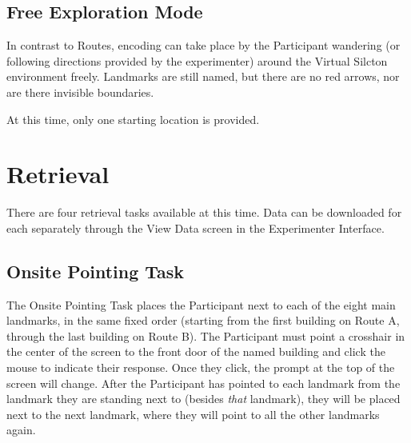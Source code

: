 \documentclass[
  12pt,
]{book}
\begin{document}
\hypertarget{free-exploration-mode}{%
\subsection{Free Exploration Mode}\label{free-exploration-mode}}

In contrast to Routes, encoding can take place by the Participant wandering (or following directions provided by the experimenter) around the Virtual Silcton environment freely. Landmarks are still named, but there are no red arrows, nor are there invisible boundaries.

At this time, only one starting location is provided.

\hypertarget{retrieval}{%
\section{Retrieval}\label{retrieval}}

There are four retrieval tasks available at this time. Data can be downloaded for each separately through the View Data screen in the Experimenter Interface.

\hypertarget{onsite-pointing-task}{%
\subsection{Onsite Pointing Task}\label{onsite-pointing-task}}

The Onsite Pointing Task places the Participant next to each of the eight main landmarks, in the same fixed order (starting from the first building on Route A, through the last building on Route B). The Participant must point a crosshair in the center of the screen to the front door of the named building and click the mouse to indicate their response. Once they click, the prompt at the top of the screen will change. After the Participant has pointed to each landmark from the landmark they are standing next to (besides \emph{that} landmark), they will be placed next to the next landmark, where they will point to all the other landmarks again.
\end{document}
